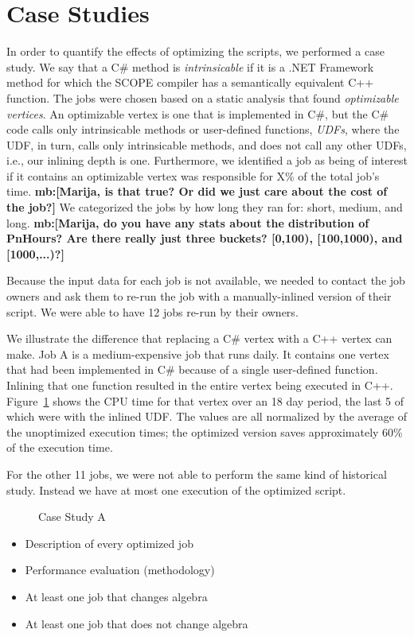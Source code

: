 \section{Case Studies}
In order to quantify the effects of optimizing the scripts, we performed a case study.
We say that a C\# method is {\em intrinsicable} if it is a .NET Framework method for which the SCOPE compiler has a semantically equivalent C++ function.
The jobs were chosen based on a static analysis that found {\em optimizable vertices}.
An optimizable vertex is one that is implemented in C\#, but the C\# code calls only intrinsicable methods or user-defined functions, {\em UDFs}, where the UDF, in turn, calls only intrinsicable methods, and does not call any other UDFs, i.e., our inlining depth is one.
Furthermore, we identified a job as being of interest if it contains an optimizable vertex was responsible for X\% of the total job's time.
{\bf mb:[Marija, is that true? Or did we just care about the cost of the job?]}
We categorized the jobs by how long they ran for: short, medium, and long.
{\bf mb:[Marija, do you have any stats about the distribution of PnHours? Are there really just three buckets? [0,100), [100,1000), and [1000,...)?]}

Because the input data for each job is not available, we needed to contact the job owners and ask them to re-run the job with a manually-inlined version of their script.
We were able to have 12 jobs re-run by their owners.

We illustrate the difference that replacing a C\# vertex with a C++ vertex can make.
Job A is a medium-expensive job that runs daily.
It contains one vertex that had been implemented in  C\# because of a single user-defined function.
Inlining that one function resulted in the entire vertex being executed in C++.
Figure~\ref{fig:CaseStudyA} shows the CPU time for that vertex over an 18 day period, the last 5 of which were with the inlined UDF.
The values are all normalized by the average of the unoptimized execution times; the optimized version saves approximately 60\% of the execution time.

For the other 11 jobs, we were not able to perform the same kind of historical study.
Instead we have at most one execution of the optimized script.

\begin{figure}[ht]
\caption{Case Study A \label{fig:CaseStudyA}}
\end{figure}


\begin{itemize}
\item Description of every optimized job
\item Performance evaluation (methodology)
\item At least one job that changes algebra
\item At least one job that does not change algebra
\end{itemize}
